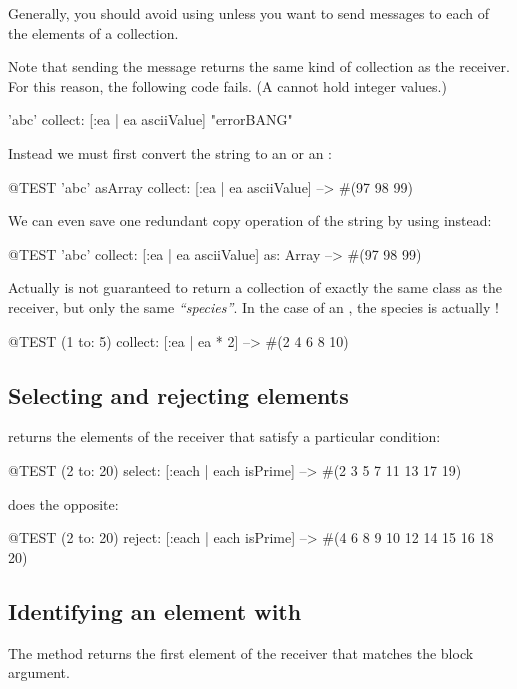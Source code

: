 \documentclass[a4paper,10pt,twoside]{book}
\begin{document}
Generally, you should avoid using  unless you want to send messages to each of the elements of a collection.

Note that sending the message  returns the same kind of collection as the receiver.
For this reason, the following code fails.
(A  cannot hold integer values.)
\begin{code}{}
'abc' collect: [:ea | ea asciiValue]      "errorBANG"
\end{code}
\noindent
Instead we must first convert the string to an  or an :
\begin{code}{@TEST}
'abc' asArray collect: [:ea | ea asciiValue] --> #(97 98 99)
\end{code}
We can even save one redundant copy operation of the string by using  instead:
\begin{code}{@TEST}
'abc' collect: [:ea | ea asciiValue] as: Array --> #(97 98 99)
\end{code}

Actually  is not guaranteed to return a collection of exactly the same class as the receiver, but only the same \emph{``species''}.
In the case of an , the species is actually !
\begin{code}{@TEST}
(1 to: 5) collect: [:ea | ea * 2] --> #(2 4 6 8 10)
\end{code}

\subsection{Selecting and rejecting elements}

 returns the elements of the receiver that satisfy a particular condition:

\begin{code}{@TEST}
(2 to: 20) select: [:each | each isPrime] --> #(2 3 5 7 11 13 17 19)
\end{code}

 does the opposite:
\begin{code}{@TEST}
(2 to: 20) reject: [:each | each isPrime] --> #(4 6 8 9 10 12 14 15 16 18 20)
\end{code}

\subsection{Identifying an element with }
The method  returns the first element of the receiver that matches the block argument. 
\end{document}

